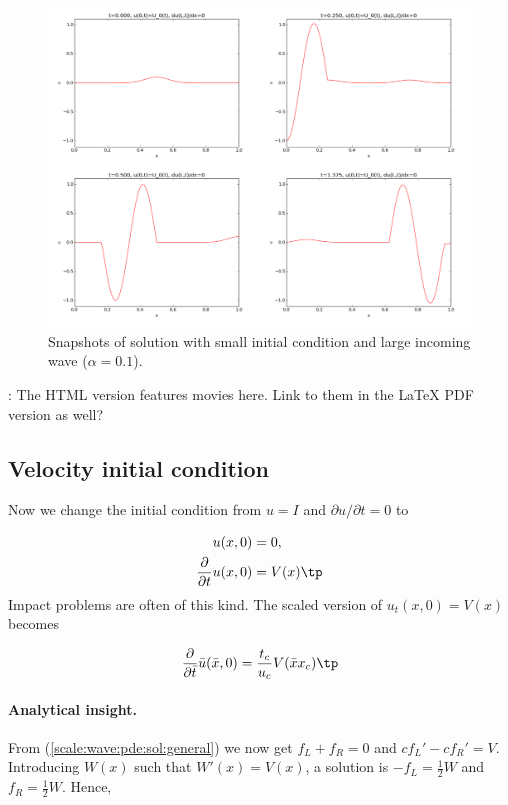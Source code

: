 \documentclass[graybox,envcountchap,sectrefs,final]{svmonodo}
\newcommand{\shortinlinecomment}[3]{{\color{red}{\bf #1}: #2}}
\begin{document}
\begin{figure}[!ht]  %
  \centerline{\includegraphics[width=1.0\linewidth]{fig-scaling/gaussian_plus_incoming_alpha01.pdf}}
  \caption{
  Snapshots of solution with small initial condition and large incoming wave ($\alpha=0.1$). \label{scale:wave:pde2:fig:alpha01}
  }
\end{figure}


\shortinlinecomment{hpl 11}{ The HTML version features movies here. Link to them in the {\LaTeX} PDF version as well? }{ The HTML version features }

\subsection{Velocity initial condition}
\label{scale:wave:pde2:Vcond}

Now we change the initial condition from $u=I$ and $\partial u/\partial t = 0$ to

\begin{align}
u(x,0) &= 0,\\ 
\frac{\partial}{\partial t} u(x,0) &= V(x)\tp
\end{align}
Impact problems are often of this kind.
The scaled version of $u_t(x,0)=V(x)$ becomes

\[ \frac{\partial}{\partial \bar t} \bar u(\bar x,0) =
\frac{t_c}{u_c}V(\bar x x_c)\tp
\]

\paragraph{Analytical insight.}
From (\ref{scale:wave:pde:sol:general}) we now get $f_L + f_R =0$ and
$cf_L' - cf_R' = V$. Introducing $W(x)$ such that $W'(x)=V(x)$, a solution
is $-f_L=\frac{1}{2}W$ and $f_R=\frac{1}{2}W$. Hence,
\end{document}
